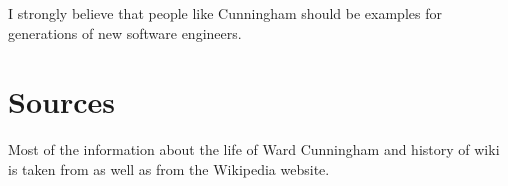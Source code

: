 \documentclass[11pt]{article}
\begin{document}

\par


I strongly believe that people like Cunningham should be examples for generations of new software engineers.


\section{Sources}
Most of the information about the life of Ward Cunningham and history of wiki is taken from \cite{innovators} \cite{wiki-revolution} \cite{cs-encyclopedia} as well as from the Wikipedia website.

%

 
\end{document}
